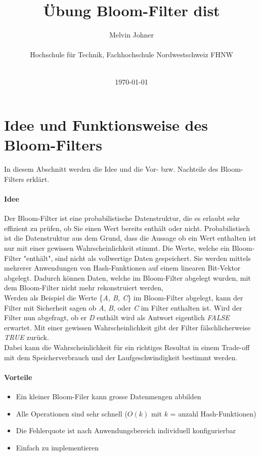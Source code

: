 \documentclass[12pt]{article}
\title{Übung Bloom-Filter dist}
\author
{Melvin Johner\\
\\
\normalsize{Hochschule für Technik, Fachhochschule Nordwestschweiz FHNW}\\
\\
}
\date{\today}
\begin{document}
 


\baselineskip24pt


\maketitle
\section*{Idee und Funktionsweise des Bloom-Filters}
In diesem Abschnitt werden die Idee und die Vor- bzw.
Nachteile des Bloom-Filters erklärt.
\paragraph*{Idee}
Der Bloom-Filter ist eine probabilistische Datenstruktur,
die es erlaubt sehr effizient zu prüfen,
ob Sie einen Wert bereits enthält oder nicht.
Probabilistisch ist die Datenstruktur aus dem Grund,
dass die Aussage ob ein Wert enthalten ist nur mit einer gewissen Wahrscheinlichkeit stimmt.
Die Werte, welche ein Bloom-Filter "enthält", sind nicht als vollwertige Daten gespeichert.
Sie werden mittels mehrerer Anwendungen von Hash-Funktionen auf einem linearen Bit-Vektor abgelegt.
Dadurch können Daten, welche im Bloom-Filter abgelegt wurden,
mit dem Bloom-Filter nicht mehr rekonstruiert werden,
\\
Werden als Beispiel die Werte \{{\it A, B, C}\} im Bloom-Filter abgelegt,
kann der Filter mit Sicherheit sagen ob {\it A}, {\it B}, oder {\it C} im Filter enthalten ist.
Wird der Filter nun abgefragt, ob er {\it D} enthält wird als Antwort eigentlich {\it FALSE} erwartet.
Mit einer gewissen Wahrscheinlichkeit gibt der Filter fälschlicherweise {\it TRUE} zurück.
\\
Dabei kann die Wahrscheinlichkeit für ein richtiges Resultat in einem
Trade-off mit dem Speicherverbrauch und der Laufgeschwindigkeit bestimmt werden.

\paragraph*{Vorteile}
\begin{itemize}
\item Ein kleiner Bloom-Filer kann grosse Datenmengen abbilden
\item Alle Operationen sind sehr schnell ($O(k)$ mit $k$ = anzahl Hash-Funktionen)
\item Die Fehlerquote ist nach Anwendungsbereich individuell konfigurierbar
\item Einfach zu implementieren
\end{itemize}
\end{document}
